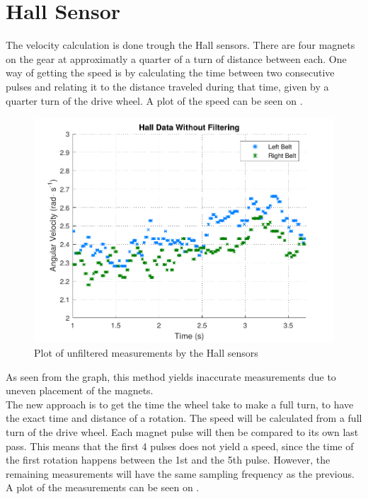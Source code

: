 \section{Hall Sensor}

The velocity calculation is done trough the Hall sensors. There are four magnets on the gear at approximatly a quarter of a turn of distance between each. One way of getting the speed is by calculating the time between two consecutive pulses and relating it to the distance traveled during that time, given by a quarter turn of the drive wheel. A plot of the speed can be seen on .

\begin{figure}[H]
	\centering
	\includegraphics[scale=0.9]{figures/unfilteredHall.pdf}
	\caption{Plot of unfiltered measurements by the Hall sensors}
	\label{unfilteredHall}
\end{figure}


As seen from the graph, this method yields inaccurate measurements due to uneven placement of the magnets.\\


The new approach is to get the time the wheel take to make a full turn, to have the exact time and distance of a rotation. The speed will be calculated from a full turn of the drive wheel. Each magnet pulse will then be compared to its own last pass. This means that the first 4 pulses does not yield a speed, since the time of the first rotation happens between the 1st and the 5th pulse. However, the remaining measurements will have the same sampling frequency as the previous. A plot of the measurements can be seen on .


